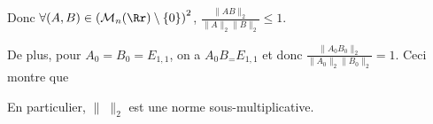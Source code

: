 {\begin{enumerate}
{Donc $\forall(A,B)\in\left(\mathcal{M}_n(\Rr)\setminus\{0\}\right)^2$, $ \frac{\|AB\|_2}{\|A\|_2\|B\|_2}\leqslant 1$.

De plus, pour $A_0=B_0=E_{1,1}$, on a $A_0B_=E_{1,1}$ et donc $ \frac{\|A_0B_0\|_2}{\|A_0\|_2\|B_0\|_2}=1$. Ceci montre que

\begin{center}
\end{center}

En particulier, $\|\;\|_2$ est une norme sous-multiplicative.
}
\end{enumerate}
}
